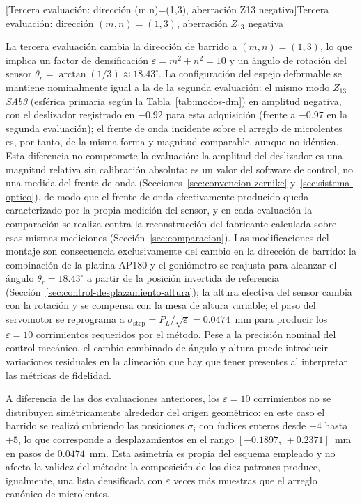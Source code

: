 \documentclass[letterpaper,12pt,oneside]{book}
\makeatletter
\renewcommand\section{\@startsection{section}{1}{\z@}{-3.5ex \@plus -1ex \@minus -.2ex}{2.3ex \@plus.2ex}{\normalfont\Large\bfseries\raggedright}}
\makeatother
\begin{document}
\section[Tercera evaluación: dirección (m,n)=(1,3), aberración Z13 negativa]{Tercera evaluación: dirección \mbox{$(m,n)=(1,3)$}, aberración $Z_{13}$ negativa}\label{sec:eval-z13-m1n3}

La tercera evaluación cambia la dirección de barrido a $(m,n)=(1,3)$, lo que implica un
factor de densificación $\varepsilon = m^2 + n^2 = 10$ y un ángulo de rotación del sensor
$\theta_r = \arctan(1/3) \approx 18.43^\circ$. La configuración del espejo deformable se
mantiene nominalmente igual a la de la segunda evaluación: el mismo modo $Z_{13}$
\textit{SAb3} (esférica primaria según la Tabla~\ref{tab:modos-dm}) en amplitud negativa,
con el deslizador registrado en $-0.92$ para esta adquisición (frente a $-0.97$ en la
segunda evaluación); el frente de onda incidente sobre el arreglo de microlentes es, por
tanto, de la misma forma y magnitud comparable, aunque no idéntica. Esta diferencia no
compromete la evaluación: la amplitud del deslizador es una magnitud relativa sin
calibración absoluta: es un valor del software de control, no una medida del frente de
onda (Secciones~\ref{sec:convencion-zernike} y~\ref{sec:sistema-optico}), de modo que el
frente de onda efectivamente producido queda caracterizado por la propia medición del
sensor, y en cada evaluación la comparación se realiza contra la reconstrucción del
fabricante calculada sobre esas mismas mediciones (Sección~\ref{sec:comparacion}). Las
modificaciones del montaje son consecuencia exclusivamente del cambio en la dirección de
barrido: la combinación de la platina AP180 y el goniómetro se reajusta para alcanzar el
ángulo $\theta_r = 18.43^\circ$ a partir de la posición invertida de referencia
(Sección~\ref{sec:control-desplazamiento-altura}); la altura efectiva del sensor cambia
con la rotación y se compensa con la mesa de altura variable; el paso del servomotor se
reprograma a $\sigma_{\text{step}} = P_L/\sqrt{\varepsilon} = 0.0474$~mm para producir los
$\varepsilon=10$ corrimientos requeridos por el método. Pese a la precisión nominal del
control mecánico, el cambio combinado de ángulo y altura puede introducir variaciones
residuales en la alineación que hay que tener presentes al interpretar las métricas de
fidelidad.

A diferencia de las dos evaluaciones anteriores, los $\varepsilon=10$ corrimientos no se
distribuyen simétricamente alrededor del origen geométrico: en este caso el barrido se
realizó cubriendo las posiciones $\sigma_i$ con índices enteros desde $-4$ hasta $+5$, lo
que corresponde a desplazamientos en el rango $[-0.1897,\,+0.2371]$~mm en pasos de
$0.0474$~mm. Esta asimetría es propia del esquema empleado y no afecta la validez del
método: la composición de los diez patrones produce, igualmente, una lista densificada con
$\varepsilon$ veces más muestras que el arreglo canónico de microlentes.
\end{document}
